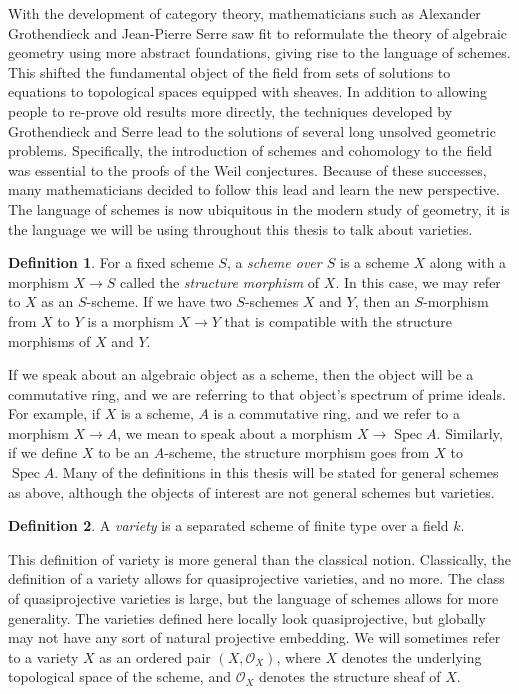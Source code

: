 \documentclass[12pt,twoside]{reedthesis}
\theoremstyle{plain}
\theoremstyle{definition}
\newtheorem{definition}{Definition}[section]
\theoremstyle{remark}
\newcommand{\calO}{\mathcal{O}}
\newcommand{\Spec}{\operatorname{Spec}}
\begin{document}
With the development of category theory, mathematicians such as Alexander Grothendieck and Jean-Pierre Serre saw fit to reformulate the theory of algebraic geometry using more abstract foundations, giving rise to the language of schemes. This shifted the fundamental object of the field from sets of solutions to equations to topological spaces equipped with sheaves. In addition to allowing people to re-prove old results more directly, the techniques developed by Grothendieck and Serre lead to the solutions of several long unsolved geometric problems. Specifically, the introduction of schemes and cohomology to the field was essential to the proofs of the Weil conjectures. Because of these successes, many mathematicians decided to follow this lead and learn the new perspective. The language of schemes is now ubiquitous in the modern study of geometry, it is the language we will be using throughout this thesis to talk about varieties. 
\begin{definition}
For a fixed scheme $S$, a \emph{scheme over $S$} is a scheme $X$ along with a morphism $X\to S$ called the \emph{structure morphism} of $X$. In this case, we may refer to $X$ as an $S$-scheme. If we have two $S$-schemes $X$ and $Y$, then an $S$-morphism from $X$ to $Y$ is a morphism $X\to Y$ that is compatible with the structure morphisms of $X$ and $Y$.\label{schemeOverDef}
\end{definition}
\noindent If we speak about an algebraic object as a scheme, then the object will be a commutative ring, and we are referring to that object's spectrum of prime ideals. For example, if $X$ is a scheme, $A$ is a commutative ring, and we refer to a morphism $X\to A$, we mean to speak about a morphism $X\to\Spec A$. Similarly, if we define $X$ to be an $A$-scheme, the structure morphism goes from $X$ to $\Spec A$. Many of the definitions in this thesis will be stated for general schemes as above, although the objects of interest are not general schemes but varieties.
\begin{definition}
A \emph{variety} is a separated scheme of finite type over a field $k$. \label{varDef}
\end{definition}
This definition of variety is more general than the classical notion. Classically, the definition of a variety allows for quasiprojective varieties, and no more. The class of quasiprojective varieties is large, but the language of schemes allows for more generality. The varieties defined here locally look quasiprojective, but globally may not have any sort of natural projective embedding. We will sometimes refer to a variety $X$ as an ordered pair $(X,\calO_X)$, where $X$ denotes the underlying topological space of the scheme, and $\calO_X$ denotes the structure sheaf of $X$. 
\end{document}
